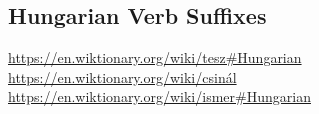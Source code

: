 \documentclass[11pt,letterpaper]{article}
\begin{document}


\subsection{Hungarian Verb Suffixes}

\url{https://en.wiktionary.org/wiki/tesz#Hungarian}
\url{https://en.wiktionary.org/wiki/csinál}
\url{https://en.wiktionary.org/wiki/ismer#Hungarian}
\end{document}
